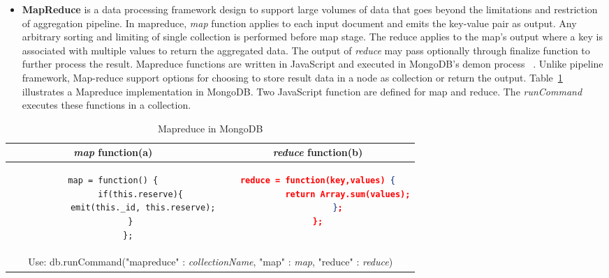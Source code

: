 \begin{itemize}
		  \item{\textbf{MapReduce}} is a data processing framework design to support large volumes of data that goes beyond the limitations and restriction of aggregation pipeline.  In mapreduce,  \textit{map} function applies to each input document and emits the key-value pair as output. Any arbitrary sorting and limiting  of single collection is performed before map stage. The reduce applies to the map's output where a key is associated with multiple values to return the aggregated data. The output of \textit{reduce} may pass optionally through finalize function to further process the result. Mapreduce functions are written in JavaScript and executed in MongoDB's demon process ~\cite{mongodbaggregation}.  Unlike pipeline framework, Map-reduce support options for choosing to store result  data in a node as collection or return the output. Table~\ref{mongdb-mapreduce} illustrates a Mapreduce implementation in MongoDB. Two JavaScript function are defined for map and reduce. The \textit{runCommand} executes these functions in a collection.
		  
\end{itemize}		

\begin{longtable}{c|c}
\caption{Mapreduce in MongoDB}
 \label{mongdb-mapreduce}\\
	
	{\textit{map}} function(a) & {\textit{reduce}} function(b)\\
	\hline
	\begin{minipage}{.4\textwidth}
		\centering		
		\begin{lstlisting}[language=XML,basicstyle = \scriptsize,label=couchbase-map-sample]
map = function() {
           if(this.reserve){
            emit(this._id, this.reserve);
           }    
        };	
		\end{lstlisting}		
	\end{minipage} &
	\begin{minipage}{.49\textwidth}
		\centering
		\begin{lstlisting}[language=JSON, basicstyle =\scriptsize, label=couchbase-reduce-sample]
reduce = function(key,values) {
            return Array.sum(values);
        };
};
		\end{lstlisting}
	\end{minipage}
	\\
	\hline
	\multicolumn{2}{c}{
	    \scriptsize
	    
	Use: 	db.runCommand({"mapreduce" : 
	\textit{collectionName}, 
	                       "map" : \textit{map}, 
	                       "reduce" : \textit{reduce}})
		
	}
  	
  	\\
	\hline
	
\end{longtable}

